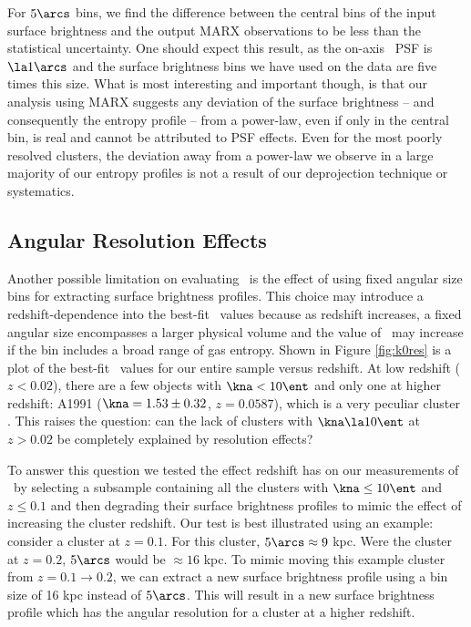 \documentclass{emulateapj}
\begin{document}
For $5\arcs$ bins, we find the difference between the central bins of
the input surface brightness and the output MARX observations to be
less than the statistical uncertainty. One should expect this result,
as the on-axis \chandra\ PSF is $\la 1\arcs$ and the surface
brightness bins we have used on the data are five times this
size. What is most interesting and important though, is that our
analysis using MARX suggests any deviation of the surface brightness
-- and consequently the entropy profile -- from a power-law, even if
only in the central bin, is real and cannot be attributed to PSF
effects. Even for the most poorly resolved clusters, the deviation
away from a power-law we observe in a large majority of our entropy
profiles is not a result of our deprojection technique or systematics.

\subsection{Angular Resolution Effects}
\label{sec:angres}

Another possible limitation on evaluating \kna\ is the effect of using
fixed angular size bins for extracting surface brightness
profiles. This choice may introduce a redshift-dependence into the
best-fit \kna\ values because as redshift increases, a fixed angular
size encompasses a larger physical volume and the value of \kna\ may
increase if the bin includes a broad range of gas entropy. Shown in
Figure \ref{fig:k0res} is a plot of the best-fit \kna\ values for our
entire sample versus redshift. At low redshift ($z < 0.02$), there are
a few objects with $\kna < 10 \ent$ and only one at higher redshift:
A1991 ($\kna = 1.53 \pm 0.32$, $z = 0.0587$), which is a very peculiar
cluster \citep{2004ApJ...613..180S}. This raises the question: can the
lack of clusters with $\kna \la 10 \ent$ at $z > 0.02$ be completely
explained by resolution effects?

To answer this question we tested the effect redshift has on our
measurements of \kna\ by selecting a subsample containing all the
clusters with $\kna \leq 10 \ent$ and $z \leq 0.1$ and then degrading
their surface brightness profiles to mimic the effect of increasing
the cluster redshift. Our test is best illustrated using an example:
consider a cluster at $z = 0.1$. For this cluster, $5\arcs \approx 9$
kpc. Were the cluster at $z = 0.2$, $5\arcs$ would be $\approx 16$
kpc. To mimic moving this example cluster from $z = 0.1 \rightarrow
0.2$, we can extract a new surface brightness profile using a bin size
of 16 kpc instead of $5\arcs$. This will result in a new surface
brightness profile which has the angular resolution for a cluster at a
higher redshift.
\end{document}

